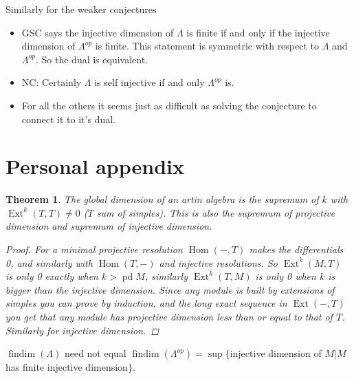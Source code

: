 \documentclass[11pt, a4paper, english]{article}
\newtheorem{theorem}{Theorem}[section]
\theoremstyle{definition}
\DeclareMathOperator{\Hom}{Hom}
\DeclareMathOperator{\Ext}{Ext}
\DeclareMathOperator{\findim}{findim}
\DeclareMathOperator{\pd}{pd}
\begin{document}
Similarly for the weaker conjectures
\begin{itemize}
	\item GSC says the injective dimension of $\Lambda$ is finite if and only if the injective dimension of $\Lambda^{op}$ is finite. This statement is symmetric with respect to $\Lambda$ and $\Lambda^{op}$. So the dual is equivalent.
	\item NC: Certainly $\Lambda$ is self injective if and only $\Lambda^{op}$ is. 
	\item For all the others it seems just as difficult as solving the conjecture to connect it to it's dual.
\end{itemize}


\section{Personal appendix}
\begin{theorem}
	The global dimension of an artin algebra is the supremum of $k$ with $\Ext^k(T,T)\neq 0$ ($T$ sum of simples). This is also the supremum of projective dimension and supremum of injective dimension.
	\begin{proof}
		For a minimal projective resolution $\Hom(-,T)$ makes the differentials 0, and similarly with $\Hom(T,-)$ and injective resolutions. So $\Ext^k(M, T)$ is only 0 exactly when $k>\pd M$, similarly $\Ext^k(T,M)$ is only 0 when $k$ is bigger than the injective dimension. Since any module is built by extensions of simples you can prove by induction, and the long exact sequence in $\Ext(-,T)$ you get that any module has projective dimension less than or equal to that of $T$. Similarly for injective dimension.
	\end{proof}
\end{theorem}

$\findim(\Lambda)$ need not equal $\findim(\Lambda^{op}) = \sup\{ $injective dimension of $M | M$ has finite injective dimension$ \}$.
\end{document}
